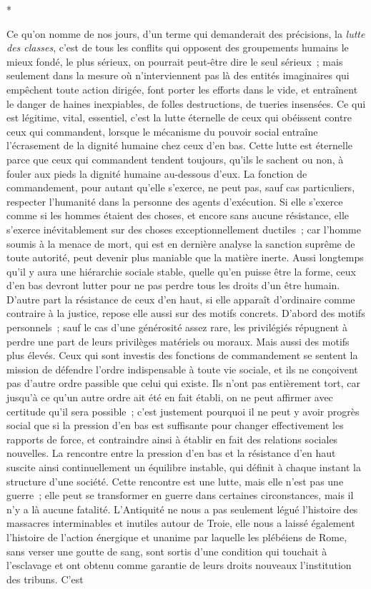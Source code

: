 \documentclass[french,twoside]{book} %
\begin{document}
\begin{center}
*\end{center}
\noindent Ce qu'on nomme de nos jours, d'un terme qui demanderait des précisions, la {\itshape lutte des classes}, c'est de tous les conflits qui opposent des groupements humains le mieux fondé, le plus sérieux, on pourrait peut-être dire le seul sérieux ; mais seulement dans la mesure où n'interviennent pas là des entités imaginaires qui empêchent toute action dirigée, font porter les efforts dans le vide, et entraînent le danger de haines inexpiables, de folles destructions, de tueries insensées. Ce qui est légitime, vital, essentiel, c'est la lutte éternelle de ceux qui obéissent contre ceux qui commandent, lorsque le mécanisme du pouvoir social entraîne l'écrasement de la dignité humaine chez ceux d'en bas. Cette lutte est éternelle parce que ceux qui commandent tendent toujours, qu'ils le sachent ou non, à fouler aux pieds la dignité humaine au-dessous d'eux. La fonction de commandement, pour autant qu'elle s'exerce, ne peut pas, sauf cas particuliers, respecter l'humanité dans la personne des agents d'exécution. Si elle s'exerce comme si les hommes étaient des choses, et encore sans aucune résistance, elle s'exerce inévitablement sur des choses exceptionnellement ductiles ; car l'homme soumis à la menace de mort, qui est en dernière analyse la sanction suprême de toute autorité, peut devenir plus maniable que la matière inerte. Aussi longtemps qu'il y aura une hiérarchie sociale stable, quelle qu'en puisse être la forme, ceux d'en bas devront lutter pour ne pas perdre tous les droits d'un être humain. D'autre part la résistance de ceux d'en haut, si elle apparaît d'ordinaire comme contraire à la justice, repose elle aussi sur des motifs concrets. D'abord des motifs personnels ; sauf le cas d'une générosité assez rare, les privilégiés répugnent à perdre une part de leurs privilèges matériels ou moraux. Mais aussi des motifs plus élevés. Ceux qui sont investis des fonctions de commandement se sentent la mission de défendre l'ordre indispensable à toute vie sociale, et ils ne conçoivent pas d'autre ordre passible que celui qui existe. Ils n'ont pas entièrement tort, car jusqu'à ce qu'un autre ordre ait été en fait établi, on ne peut affirmer avec certitude qu'il sera possible ; c'est justement pourquoi il ne peut y avoir progrès social que si la pression d'en bas est suffisante pour changer effectivement les rapports de force, et contraindre ainsi à établir en fait des relations sociales nouvelles. La rencontre entre la pression d'en bas et la résistance d'en haut suscite ainsi continuellement un équilibre instable, qui définit à chaque instant la structure d'une société. Cette rencontre est une lutte, mais elle n'est pas une guerre ; elle peut se transformer en guerre dans certaines circonstances, mais il n'y a là aucune fatalité. L'Antiquité ne nous a pas seulement légué l'histoire des massacres interminables et inutiles autour de Troie, elle nous a laissé également l'histoire de l'action énergique et unanime par laquelle les plébéiens de Rome, sans verser une goutte de sang, sont sortis d'une condition qui touchait à l'esclavage et ont obtenu comme garantie de leurs droits nouveaux l'institution des tribuns. C'est 
\end{document}
